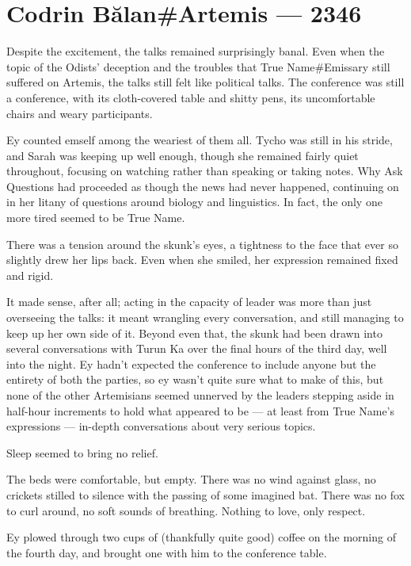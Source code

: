 \hypertarget{codrin-bux103lanartemis-2346}{%
\chapter{Codrin Bălan\#Artemis — 2346}\label{codrin-bux103lanartemis-2346}}

Despite the excitement, the talks remained surprisingly banal. Even when the topic of the Odists' deception and the troubles that True Name\#Emissary still suffered on Artemis, the talks still felt like political talks. The conference was still a conference, with its cloth-covered table and shitty pens, its uncomfortable chairs and weary participants.

Ey counted emself among the weariest of them all. Tycho was still in his stride, and Sarah was keeping up well enough, though she remained fairly quiet throughout, focusing on watching rather than speaking or taking notes. Why Ask Questions had proceeded as though the news had never happened, continuing on in her litany of questions around biology and linguistics. In fact, the only one more tired seemed to be True Name.

There was a tension around the skunk's eyes, a tightness to the face that ever so slightly drew her lips back. Even when she smiled, her expression remained fixed and rigid.

It made sense, after all; acting in the capacity of leader was more than just overseeing the talks: it meant wrangling every conversation, and still managing to keep up her own side of it. Beyond even that, the skunk had been drawn into several conversations with Turun Ka over the final hours of the third day, well into the night. Ey hadn't expected the conference to include anyone but the entirety of both the parties, so ey wasn't quite sure what to make of this, but none of the other Artemisians seemed unnerved by the leaders stepping aside in half-hour increments to hold what appeared to be — at least from True Name's expressions — in-depth conversations about very serious topics.

Sleep seemed to bring no relief.

The beds were comfortable, but empty. There was no wind against glass, no crickets stilled to silence with the passing of some imagined bat. There was no fox to curl around, no soft sounds of breathing. Nothing to love, only respect.

Ey plowed through two cups of (thankfully quite good) coffee on the morning of the fourth day, and brought one with him to the conference table.

